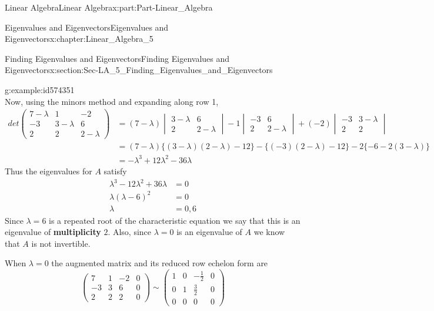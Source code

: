 \documentclass[oneside,10pt,]{book}
\newcommand{\terminology}[1]{\textbf{#1}}
\numberwithin{equation}{section}
\newcommand{\amp}{&}
\begin{document}
\begin{partptx}{Linear Algebra}{}{Linear Algebra}{}{}{x:part:Part-Linear_Algebra}
\begin{chapterptx}{Eigenvalues and Eigenvectors}{}{Eigenvalues and Eigenvectors}{}{}{x:chapter:Linear_Algebra_5}
\begin{sectionptx}{Finding Eigenvalues and Eigenvectors}{}{Finding Eigenvalues and Eigenvectors}{}{}{x:section:Sec-LA_5_Finding_Eigenvalues_and_Eigenvectors}
\begin{example}{}{g:example:id574351}
\begin{equation*}
\end{equation*}
Now, using the minors method and expanding along row 1,%
\begin{align*}
det\begin{pmatrix} 7-\lambda \amp 1 \amp -2 \\ -3 \amp 3-\lambda \amp 6 \\ 2 \amp 2\amp 2-\lambda \end{pmatrix} \amp =(7-\lambda)\begin{vmatrix} 3-\lambda \amp 6 \\ 2 \amp 2-\lambda \end{vmatrix}-1\begin{vmatrix} -3 \amp 6 \\ 2 \amp 2-\lambda \end{vmatrix}+(-2)\begin{vmatrix} -3 \amp 3-\lambda \\ 2 \amp 2 \end{vmatrix} \\
\amp = (7-\lambda)\{(3-\lambda)(2-\lambda)-12\}-\{(-3)(2-\lambda)-12\}-2\{-6-2(3-\lambda)\}\\
\amp = -\lambda^3+12\lambda^2-36\lambda
\end{align*}
Thus the eigenvalues for \(A\) satisfy%
\begin{align*}
\lambda^3-12\lambda^2+36\lambda \amp =0\\
\lambda(\lambda-6)^2 \amp =0\\
\lambda \amp = 0, 6
\end{align*}
Since \(\lambda=6\) is a repeated root of the characteristic equation we say that this is an eigenvalue of \terminology{multiplicity} \(2\). Also, since \(\lambda=0\) is an eigenvalue of \(A\) we know that \(A\) is not invertible.%
\par
When \(\lambda=0\) the augmented matrix and its reduced row echelon form are%
\begin{equation*}
\begin{pmatrix} 7 \amp 1 \amp -2 \amp 0 \\ -3 \amp 3 \amp 6 \amp 0 \\ 2 \amp 2 \amp 2 \amp 0 \end{pmatrix} \sim \begin{pmatrix} 1 \amp 0 \amp -\frac{1}{2} \amp 0 \\ 0 \amp 1 \amp \frac{3}{2} \amp 0 \\ 0 \amp 0 \amp 0 \amp 0 \end{pmatrix} 
\end{equation*}

\end{example}
\end{sectionptx}
\end{chapterptx}
\end{partptx}
\end{document}
